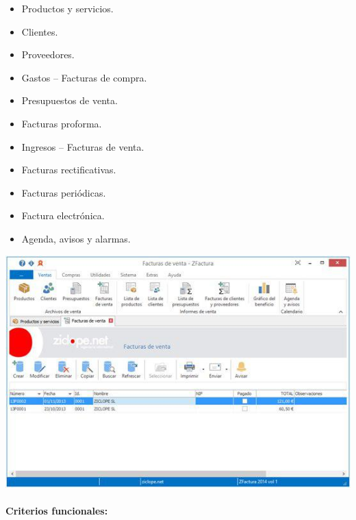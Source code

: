 \documentclass{article}
\begin{document}
\begin{itemize}
	\item Productos y servicios.
	\item Clientes.
	\item Proveedores.
	\item Gastos – Facturas de compra.
	\item Presupuestos de venta.
	\item Facturas proforma.
	\item Ingresos – Facturas de venta.
	\item Facturas rectificativas.
	\item Facturas periódicas.
	\item Factura electrónica.
	\item Agenda, avisos y alarmas.
\end{itemize}

\begin{flushleft}
	\includegraphics[scale=0.6]{imagenes/ZFactura.jpg} 
\end{flushleft}

\paragraph{Criterios funcionales:}
\end{document}
